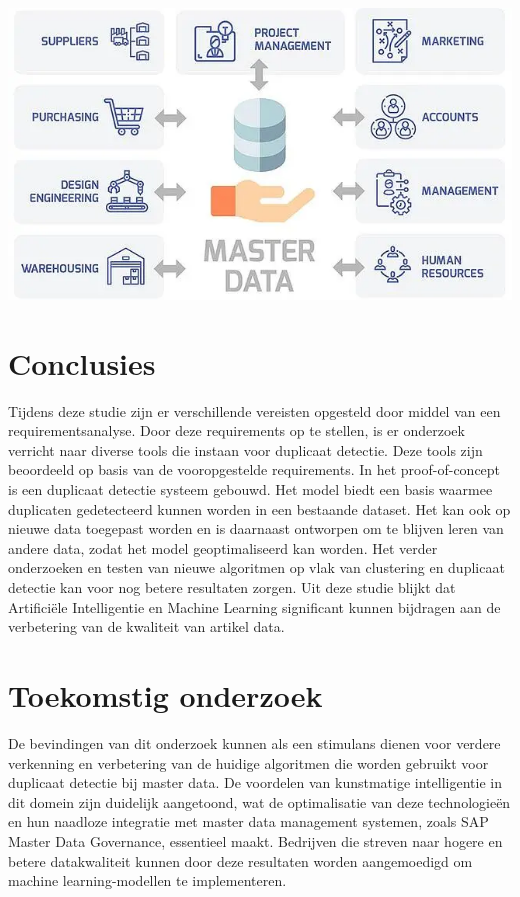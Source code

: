 \documentclass[a0,portrait]{hogent-poster}
\begin{document}
\begin{multicols}{2}


\begin{center}
  \captionsetup{type=figure}
  \includegraphics[width=1.0\linewidth]{../images/Master-Data.png}
\end{center}


\section{Conclusies}

Tijdens deze studie zijn er verschillende vereisten opgesteld door middel van een requirementsanalyse. Door deze requirements op te stellen, is er onderzoek verricht naar diverse tools die instaan voor duplicaat detectie. Deze tools zijn beoordeeld op basis van de vooropgestelde requirements. In het proof-of-concept is een duplicaat detectie systeem gebouwd. Het model biedt een basis waarmee duplicaten gedetecteerd kunnen worden in een bestaande dataset. Het kan ook op nieuwe data toegepast worden en is daarnaast ontworpen om te blijven leren van andere data, zodat het model geoptimaliseerd kan worden. Het verder onderzoeken en testen van nieuwe algoritmen op vlak van clustering en duplicaat detectie kan voor nog betere resultaten zorgen. Uit deze studie blijkt dat Artificiële Intelligentie en Machine Learning significant kunnen bijdragen aan de verbetering van de kwaliteit van artikel data. 

\section{Toekomstig onderzoek}

De bevindingen van dit onderzoek kunnen als een stimulans dienen voor verdere verkenning en verbetering van de huidige algoritmen die worden gebruikt voor duplicaat detectie bij master data. De voordelen van kunstmatige intelligentie in dit domein zijn duidelijk aangetoond, wat de optimalisatie van deze technologieën en hun naadloze integratie met master data management systemen, zoals SAP Master Data Governance, essentieel maakt. Bedrijven die streven naar hogere en betere datakwaliteit kunnen door deze resultaten worden aangemoedigd om machine learning-modellen te implementeren. 

\end{multicols}
\end{document}
